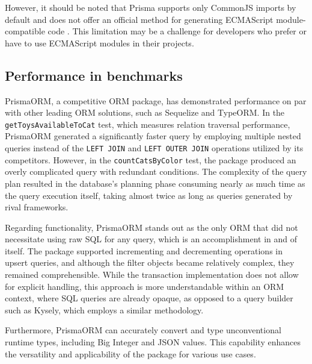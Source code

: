 However, it should be noted that Prisma supports only CommonJS imports by
default and does not offer an official method for generating ECMAScript
module-compatible code \cite{prismaES6}. This limitation may be a challenge for
developers who prefer or have to use ECMAScript modules in their projects.

\subsection*{Performance in benchmarks}

PrismaORM, a competitive ORM package, has demonstrated performance on par with
other leading ORM solutions, such as Sequelize and TypeORM. In the
\texttt{getToysAvailableToCat} test, which measures relation traversal
performance, PrismaORM generated a significantly faster query by employing
multiple nested queries instead of the \texttt{LEFT JOIN} and \texttt{LEFT OUTER
JOIN} operations utilized by its competitors. However, in the
\texttt{countCatsByColor} test, the package produced an overly complicated query
with redundant conditions. The complexity of the query plan resulted in the
database's planning phase consuming nearly as much time as the query execution
itself, taking almost twice as long as queries generated by rival frameworks.

Regarding functionality, PrismaORM stands out as the only ORM that did not
necessitate using raw SQL for any query, which is an accomplishment in and of
itself. The package supported incrementing and decrementing operations in upsert
queries, and although the filter objects became relatively complex, they
remained comprehensible. While the transaction implementation does not allow for
explicit handling, this approach is more understandable within an ORM context,
where SQL queries are already opaque, as opposed to a query builder such as
Kysely, which employs a similar methodology.

Furthermore, PrismaORM can accurately convert and type unconventional runtime
types, including Big Integer and JSON values. This capability enhances the
versatility and applicability of the package for various use cases.
